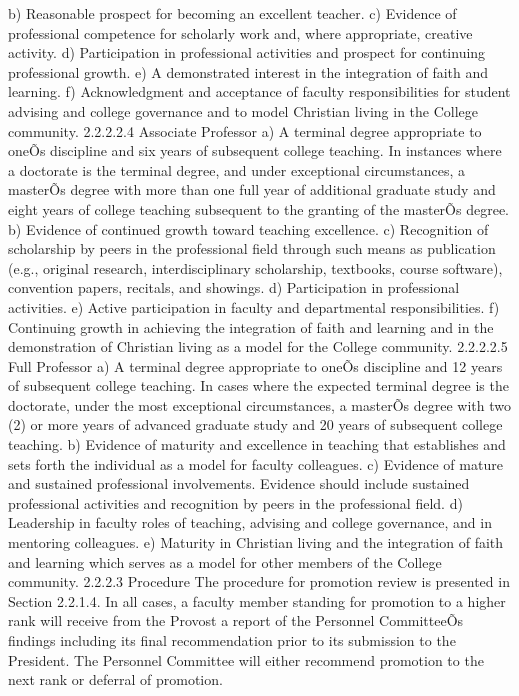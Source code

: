 \documentclass[letterpaper, 11pt]{article}
\begin{document}
b) Reasonable prospect for becoming an excellent teacher.
c) Evidence of professional competence for scholarly work and, where appropriate, creative activity.
d) Participation in professional activities and prospect for continuing professional growth.
e) A demonstrated interest in the integration of faith and learning.
f) Acknowledgment and acceptance of faculty responsibilities for student advising and college governance and to model Christian living in the College community.
2.2.2.2.4 Associate Professor
a) A terminal degree appropriate to oneÕs discipline and six years of subsequent college teaching. In instances where a doctorate is the terminal degree, and under exceptional circumstances, a masterÕs degree with more than one full year of additional graduate study and eight years of college teaching subsequent to the granting of the masterÕs degree.
b) Evidence of continued growth toward teaching excellence.
c) Recognition of scholarship by peers in the professional field through such means as publication (e.g., original research, interdisciplinary scholarship, textbooks, course software), convention papers, recitals, and showings.
d) Participation in professional activities.
e) Active participation in faculty and departmental responsibilities.
f) Continuing growth in achieving the integration of faith and learning and in the demonstration of Christian living as a model for the College community.
2.2.2.2.5 Full Professor
a) A terminal degree appropriate to oneÕs discipline and 12 years of subsequent college teaching. In cases where the expected terminal degree is the doctorate, under the most exceptional circumstances, a masterÕs degree with two (2) or more years of advanced graduate study and 20 years of subsequent college teaching.
b) Evidence of maturity and excellence in teaching that establishes and sets forth the individual as a model for faculty colleagues.
c) Evidence of mature and sustained professional involvements. Evidence should include sustained professional activities and recognition by peers in the professional field.
d) Leadership in faculty roles of teaching, advising and college governance, and in mentoring colleagues.
e) Maturity in Christian living and the integration of faith and learning which serves as a model for other members of the College community.
2.2.2.3 Procedure
   The procedure for promotion review is presented in Section 2.2.1.4.  In all cases, a faculty member standing for promotion to a higher rank will receive from the Provost a report of the Personnel CommitteeÕs findings including its final recommendation prior to its submission to the President.  The Personnel Committee will either recommend promotion to the next rank or deferral of promotion.
\end{document}
